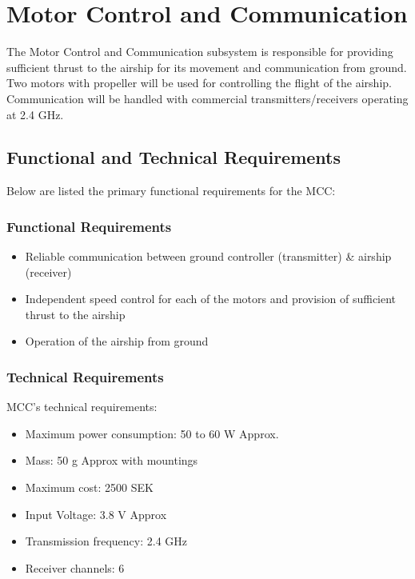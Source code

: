 \chapter{Motor Control and Communication}
\label{chap:mcc}

The Motor Control and Communication subsystem is responsible for providing sufficient thrust to the airship for its movement and communication from ground. Two motors with propeller will be used for controlling the flight of the airship. Communication will be handled with commercial transmitters/receivers operating at 2.4 GHz. 

\section{Functional and Technical Requirements}

Below are listed the primary functional requirements for the MCC:

\subsection{Functional Requirements}

\begin{itemize}
\item Reliable communication between ground controller (transmitter) \& airship (receiver)
\item Independent speed control for each of the motors and provision of sufficient thrust to the airship
\item Operation of the airship from ground 
\end{itemize}


\subsection{Technical Requirements}

MCC's technical requirements:

\begin{itemize}
\item Maximum power consumption: 50 to 60 W Approx. 
\item Mass: 50 g Approx with mountings
\item Maximum cost: 2500 SEK
\item Input Voltage: 3.8 V Approx
\item Transmission frequency: 2.4 GHz
\item Receiver channels: 6
\end{itemize}

